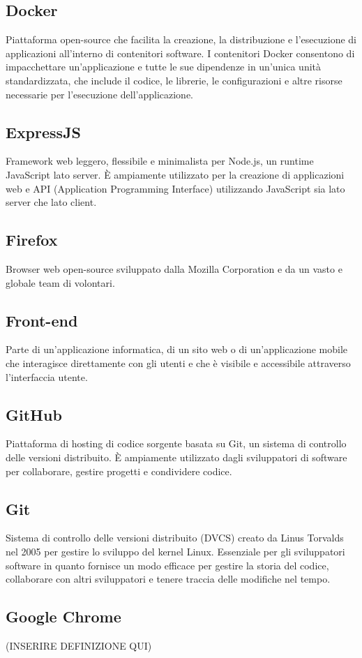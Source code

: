 \subsection{Docker}Piattaforma open-source che facilita la creazione, la distribuzione e l'esecuzione di applicazioni all'interno di contenitori software. I contenitori Docker consentono di impacchettare un'applicazione e tutte le sue dipendenze in un'unica unità standardizzata, che include il codice, le librerie, le configurazioni e altre risorse necessarie per l'esecuzione dell'applicazione.
\subsection{ExpressJS}Framework web leggero, flessibile e minimalista per Node.js, un runtime JavaScript lato server. È ampiamente utilizzato per la creazione di applicazioni web e API (Application Programming Interface) utilizzando JavaScript sia lato server che lato client.
\subsection{Firefox}Browser web open-source sviluppato dalla Mozilla Corporation e da un vasto e globale team di volontari.
\subsection{Front-end}Parte di un'applicazione informatica, di un sito web o di un'applicazione mobile che interagisce direttamente con gli utenti e che è visibile e accessibile attraverso l'interfaccia utente.
\subsection{GitHub}Piattaforma di hosting di codice sorgente basata su Git, un sistema di controllo delle versioni distribuito. È ampiamente utilizzato dagli sviluppatori di software per collaborare, gestire progetti e condividere codice.
\subsection{Git}Sistema di controllo delle versioni distribuito (DVCS) creato da Linus Torvalds nel 2005 per gestire lo sviluppo del kernel Linux. Essenziale per gli sviluppatori software in quanto fornisce un modo efficace per gestire la storia del codice, collaborare con altri sviluppatori e tenere traccia delle modifiche nel tempo.
\subsection{Google Chrome} (INSERIRE DEFINIZIONE QUI)
